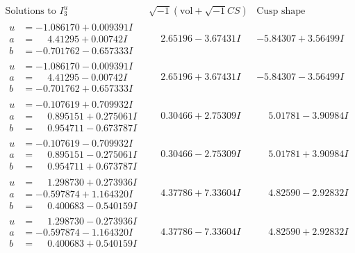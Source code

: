 \documentclass[1p]{elsarticle_modified}
\theoremstyle{definition}
\newcommand{\I}{\sqrt{-1}}
\begin{document}
$$\begin{array}{c|c|c}  
\text{Solutions to }I^u_{3}& \I (\text{vol} + \sqrt{-1}CS) & \text{Cusp shape}\\
 \hline 
\begin{aligned}
u &= -1.086170 + 0.009391 I \\
a &= \phantom{-}4.41295 + 0.00742 I \\
b &= -0.701762 - 0.657333 I\end{aligned}
 & \phantom{-}2.65196 - 3.67431 I & -5.84307 + 3.56499 I \\ \hline\begin{aligned}
u &= -1.086170 - 0.009391 I \\
a &= \phantom{-}4.41295 - 0.00742 I \\
b &= -0.701762 + 0.657333 I\end{aligned}
 & \phantom{-}2.65196 + 3.67431 I & -5.84307 - 3.56499 I \\ \hline\begin{aligned}
u &= -0.107619 + 0.709932 I \\
a &= \phantom{-}0.895151 + 0.275061 I \\
b &= \phantom{-}0.954711 - 0.673787 I\end{aligned}
 & \phantom{-}0.30466 + 2.75309 I & \phantom{-}5.01781 - 3.90984 I \\ \hline\begin{aligned}
u &= -0.107619 - 0.709932 I \\
a &= \phantom{-}0.895151 - 0.275061 I \\
b &= \phantom{-}0.954711 + 0.673787 I\end{aligned}
 & \phantom{-}0.30466 - 2.75309 I & \phantom{-}5.01781 + 3.90984 I \\ \hline\begin{aligned}
u &= \phantom{-}1.298730 + 0.273936 I \\
a &= -0.597874 + 1.164320 I \\
b &= \phantom{-}0.400683 - 0.540159 I\end{aligned}
 & \phantom{-}4.37786 + 7.33604 I & \phantom{-}4.82590 - 2.92832 I \\ \hline\begin{aligned}
u &= \phantom{-}1.298730 - 0.273936 I \\
a &= -0.597874 - 1.164320 I \\
b &= \phantom{-}0.400683 + 0.540159 I\end{aligned}
 & \phantom{-}4.37786 - 7.33604 I & \phantom{-}4.82590 + 2.92832 I \\ \hline\begin{aligned}

\end{aligned}
\end{array}$$
\end{document}
